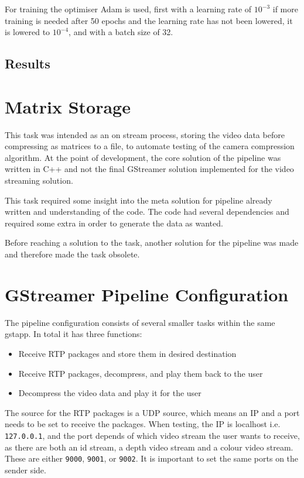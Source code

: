 For training the optimiser Adam is used, first with a learning rate of $ 10^{-3} $ if more training is needed after 50 epochs and the learning rate has not been lowered, it is lowered to $ 10^{-4} $, and with a batch size of 32. 

\subsection{Results}


\section{Matrix Storage}
This task was intended as an on stream process, storing the video data before compressing as matrices to a file, to automate testing of the camera compression algorithm. At the point of development, the core solution of the pipeline was written in C++ and not the final GStreamer solution implemented for the video streaming solution.

This task required some insight into the meta solution for pipeline already written and understanding of the code. The code had several dependencies and required some extra in order to generate the data as wanted.

Before reaching a solution to the task, another solution for the pipeline was made and therefore made the task obsolete.

\section{GStreamer Pipeline Configuration}\label{sec:gstream_design}
The pipeline configuration consists of several smaller tasks within the same \gls{gstapp}. In total it has three functions:

\begin{itemize}
	\item Receive RTP packages and store them in desired destination
	\item Receive RTP packages, decompress, and play them back to the user
	\item Decompress the video data and play it for the user
\end{itemize}

The source for the RTP packages is a UDP source, which means an IP and a port needs to be set to receive the packages. When testing, the IP is localhost i.e. \lstinline|127.0.0.1|, and the port depends of which video stream the user wants to receive, as there are both an id stream, a depth video stream and a colour video stream. These are either \lstinline|9000|, \lstinline|9001|, or \lstinline|9002|. It is important to set the same ports on the sender side.

